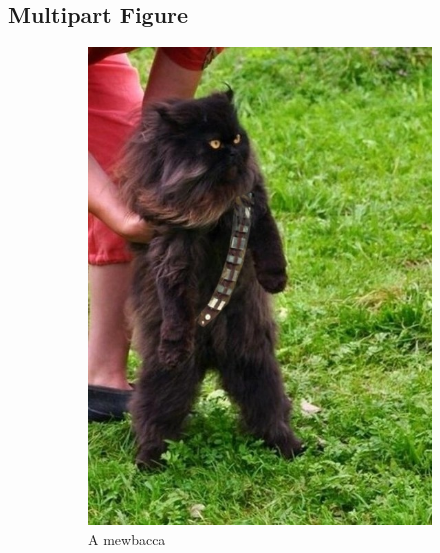 \documentclass[12pt,a4paper]{article}
\begin{document}
    \subsection{Multipart Figure}


    \begin{figure}[ht!]
            \centering
            \begin{subfigure}[b]{0.3\textwidth}
                    \includegraphics[width=\textwidth]{mewbacca.jpg}
                    \caption{A mewbacca}
                    \label{fig:mewsub1}
            \end{subfigure}
            ~ 
            \begin{subfigure}[b]{0.3\textwidth}

\end{subfigure}
\end{figure}
\end{document}
